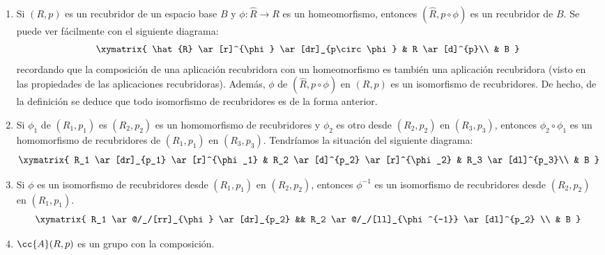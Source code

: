 \begin{observacion}\
    \begin{enumerate}
        \item Si $(R,p)$ es un recubridor de un espacio base $B$ y $\phi:\hat{R}\to R$ es un homeomorfismo, entonces $(\hat{R}, p\circ \phi)$ es un recubridor de $B$. Se puede ver fácilmente con el siguiente diagrama:
        \begin{gather*}
            \xymatrix{
                \hat{R} \ar[r]^{\phi} \ar[dr]_{p\circ \phi} & R \ar[d]^{p}\\
                & B
            }
        \end{gather*}
        recordando que la composición de una aplicación recubridora con un homeomorfismo es también una aplicación recubridora (visto en las propiedades de las aplicaciones recubridoras). Además, $\phi$ de $(\hat{R}, p\circ \phi)$ en $(R,p)$ es un isomorfismo de recubridores. De hecho, de la definición se deduce que todo isomorfismo de recubridores es de la forma anterior.

        \item Si $\phi_1$ de $(R_1,p_1)$ es $(R_2,p_2)$ es un homomorfismo de recubridores y $\phi_2$ es otro desde $(R_2,p_2)$ en $(R_3,p_3)$, entonces $\phi_2\circ \phi_1$ es un homomorfismo de recubridores de $(R_1,p_1)$ en $(R_3, p_3)$. Tendríamos la situación del siguiente diagrama:
        \begin{gather*}
            \xymatrix{
                R_1 \ar[dr]_{p_1} \ar[r]^{\phi_1} & R_2 \ar[d]^{p_2} \ar[r]^{\phi_2} & R_3 \ar[dl]^{p_3}\\
                & B 
            }
        \end{gather*}

        \item Si $\phi$ es un isomorfismo de recubridores desde $(R_1,p_1)$ en $(R_2,p_2)$, entonces $\phi^{-1}$ es un isomorfismo de recubridores desde $(R_2,p_2)$ en $(R_1,p_1)$.
        \begin{gather*}
            \xymatrix{
                R_1 \ar@/_/[rr]_{\phi} \ar[dr]_{p_2} && R_2 \ar@/_/[ll]_{\phi^{-1}} \ar[dl]^{p_2} \\
                & B
            }
        \end{gather*}

        \item $\cc{A}(R,p)$ es un grupo con la composición.
    \end{enumerate}
\end{observacion}

